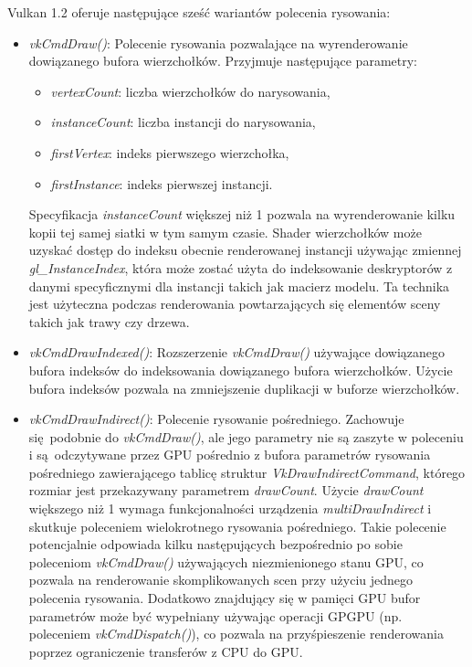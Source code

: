 Vulkan 1.2 oferuje następujące sześć wariantów polecenia rysowania:
\begin{itemize}
	\item \textit{vkCmdDraw()}:
	Polecenie rysowania pozwalające na wyrenderowanie dowiązanego bufora wierzchołków.
	Przyjmuje następujące parametry:
	\begin{itemize}
		\item \textit{vertexCount}: liczba wierzchołków do narysowania,
		\item \textit{instanceCount}: liczba instancji do narysowania,
		\item \textit{firstVertex}: indeks pierwszego wierzchołka,
		\item \textit{firstInstance}: indeks pierwszej instancji.
	\end{itemize}
	Specyfikacja \textit{instanceCount} większej niż 1 pozwala na wyrenderowanie kilku kopii tej samej siatki w tym samym czasie. Shader wierzchołków może uzyskać dostęp do indeksu obecnie renderowanej instancji używając zmiennej \textit{gl\_InstanceIndex}, która może zostać użyta do indeksowanie deskryptorów z danymi specyficznymi dla instancji takich jak macierz modelu.
	Ta technika jest użyteczna podczas renderowania powtarzających się elementów sceny takich jak trawy czy drzewa. 

	\item \textit{vkCmdDrawIndexed()}: Rozszerzenie \textit{vkCmdDraw()} używające dowiązanego bufora indeksów do indeksowania dowiązanego bufora wierzchołków.
	Użycie bufora indeksów pozwala na zmniejszenie duplikacji w buforze wierzchołków.
	
	\item \textit{vkCmdDrawIndirect()}: Polecenie rysowanie pośredniego.
	Zachowuje się podobnie do \textit{vkCmdDraw()}, ale jego parametry nie są zaszyte w poleceniu i są odczytywane przez GPU pośrednio z bufora parametrów rysowania pośredniego zawierającego tablicę struktur \textit{VkDrawIndirectCommand}, którego rozmiar jest przekazywany parametrem \textit{drawCount}.
	Użycie \textit{drawCount} większego niż 1 wymaga funkcjonalności urządzenia \textit{multiDrawIndirect} i skutkuje poleceniem wielokrotnego rysowania pośredniego.
	Takie polecenie potencjalnie odpowiada kilku następujących bezpośrednio po sobie poleceniom \textit{vkCmdDraw()} używających niezmienionego stanu GPU, co pozwala na renderowanie skomplikowanych scen przy użyciu jednego polecenia rysowania.
	Dodatkowo znajdujący się w pamięci GPU bufor parametrów może być wypełniany używając operacji GPGPU (np. poleceniem \textit{vkCmdDispatch()}), co pozwala na przyśpieszenie renderowania poprzez ograniczenie transferów z CPU do GPU.
	

\end{itemize}

